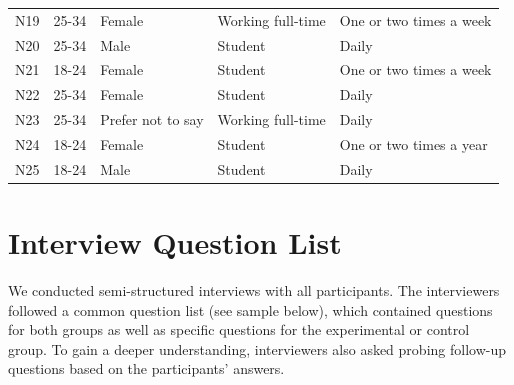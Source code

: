 \begin{table}[t]
\begin{tabular}{@{}p{2.5cm} p{2cm} p{2.5cm} p{4cm} p{4cm}@{}}
N19             & 25-34        & Female                  & Working full-time             & One or two times a week     \\
N20             & 25-34        & Male                    & Student                      & Daily                       \\
N21             & 18-24        & Female                  & Student                      & One or two times a week     \\
N22             & 25-34        & Female                  & Student                      & Daily                       \\
N23             & 25-34        & Prefer not to say       & Working full-time             & Daily                       \\
N24             & 18-24        & Female                  & Student                      & One or two times a year     \\
N25             & 18-24        & Male                    & Student                      & Daily                       \\
\bottomrule
\end{tabular}
\end{table}


\section{Interview Question List}
\label{appx:interview}
We conducted semi-structured interviews with all participants. The interviewers followed a common question list (see sample below), which contained questions for both groups as well as specific questions for the experimental or control group. To gain a deeper understanding, interviewers also asked probing follow-up questions based on the participants' answers.

